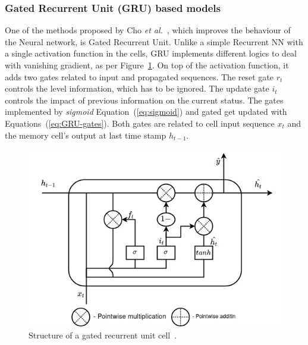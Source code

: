%
\subsubsection{Gated Recurrent Unit (GRU) based models} \label{subsub:gru}
One of the methods proposed by Cho \textit{et al.}~\cite{GRU_cho_properties_2014}, which improves the behaviour of the Neural network, is Gated Recurrent Unit.
Unlike a simple Recurrent NN with a single activation function in the cells, GRU implements different logics to deal with vanishing gradient, as per \mbox{Figure~\ref{fig:GRU-cell}}.
On top of the activation function, it adds two gates related to input and propagated sequences.
The reset gate $r_t$ controls the level information, which has to be ignored.
The update gate $i_t$ controls the impact of previous information on the current status.
The gates implemented by \textit{sigmoid} \mbox{Equation~(\ref{eq:sigmoid})} and gated get updated with \mbox{Equations~(\ref{eq:GRU-gates})}.
Both gates are related to cell input sequence $x_t$ and the memory cell's output at last time stamp $h_{t-1}$.
\begin{figure}[ht]%
    \centering
    \includegraphics[width=\linewidth]{II_Body/GRU/images/GRU.jpg}
    \caption{Structure of a gated recurrent unit cell~\cite{li_approach_2019}.}
    \label{fig:GRU-cell}
\end{figure}
